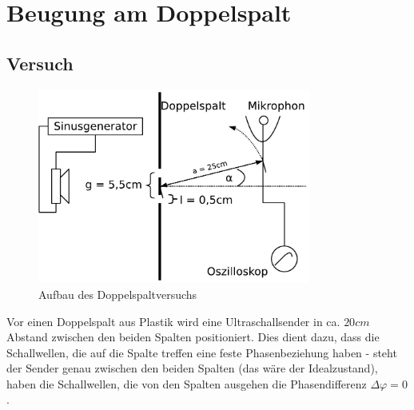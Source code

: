 % 
% 
% 
% 
% 
% 
% 
% 
% 


\section{Beugung am Doppelspalt}


\subsection{Versuch}

\begin{figure}
	\centering
   \includegraphics[width=0.8\textwidth]{praktika/mat_praktika/doppelspalt}
   \caption{Aufbau des Doppelspaltversuchs}
\end{figure}



Vor einen Doppelspalt aus Plastik wird eine Ultraschallsender in ca. \(20cm\) Abstand zwischen den beiden Spalten positioniert. Dies dient dazu, dass die Schallwellen, die auf die Spalte treffen eine feste Phasenbeziehung haben - steht der Sender genau zwischen den beiden Spalten (das wäre der Idealzustand), haben die Schallwellen, die von den Spalten ausgehen die Phasendifferenz \(\Delta \varphi = 0\).

